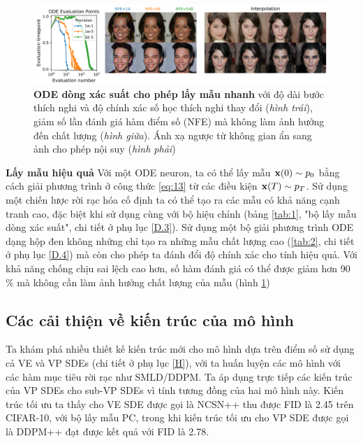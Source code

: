 \documentclass{article} %
\begin{document}
\begin{figure}[h!]
    \centering
    \includegraphics[width=0.9\linewidth]{figures/3.png}
    \caption{\textbf{ODE dòng xác suất cho phép lấy mẫu nhanh} với độ dài bước thích nghi và độ chính xác số học thích nghi thay đổi (\textit{hình trái}), giảm số lần đánh giá hàm điểm số (NFE) mà không làm ảnh hưởng đến chất lượng (\textit{hình giữa}).
    Ánh xạ ngược từ không gian ẩn sang ảnh cho phép nội suy (\textit{hình phải})}
    \label{fig:3}
\end{figure}

\textbf{Lấy mẫu hiệu quả} Với một ODE neuron, ta có thể lấy mẫu $\bold{x}(0) \sim p_0$ bằng cách giải phương trình ở công thức \ref{eq:13} từ các điều kiện $\bold{x}(T) \sim p_T$.
Sử dụng một chiến lược rời rạc hóa cố định ta có thể tạo ra các mẫu có khả năng cạnh tranh cao, đặc biệt khi sử dụng cùng với bộ hiệu chỉnh (bảng \ref{tab:1}, "bộ lấy mẫu dòng xác suất", chi tiết ở phụ lục \ref{D.3}).
Sử dụng một bộ giải phương trình ODE dạng hộp đen \citep{dormand1980family} không những chỉ tạo ra những mẫu chất lượng cao (\ref{tab:2}, chi tiết ở phụ lục \ref{D.4}) mà còn cho phép ta đánh đổi độ chính xác cho tính hiệu quả.
Với khả năng chống chịu sai lệch cao hơn, số hàm đánh giá có thể được giảm hơn 90 \% mà không cần làm ảnh hưởng chất lượng của mẫu (hình \ref{fig:3})

\subsection{Các cải thiện về kiến trúc của mô hình} \label{4.4}

Ta khám phá nhiều thiết kế kiến trúc mới cho mô hình dựa trên điểm số sử dụng cả VE và VP SDEs (chi tiết ở phụ lục \ref{H}), với ta huấn luyện các mô hình với các hàm mục tiêu rời rạc như SMLD/DDPM.
Ta áp dụng trực tiếp các kiến trúc của VP SDEs cho sub-VP SDEs vì tính tương đồng của hai mô hình này.
Kiến trúc tối ưu ta thấy cho VE SDE được gọi là NCSN++ thu được FID là 2.45 trên CIFAR-10, với bộ lấy mẫu PC, trong khi kiến trúc tối ưu cho VP SDE được gọi là DDPM++ đạt được kết quả với FID là 2.78.
\end{document}
